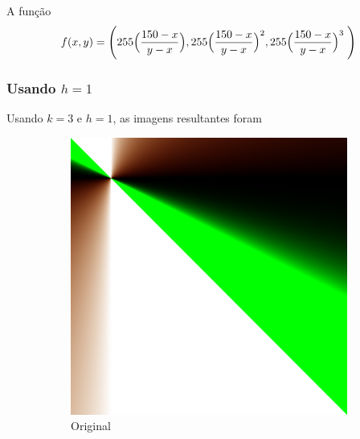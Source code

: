 \documentclass{article}
\begin{document}
A função
\begin{equation}
  f(x,y) = \Biggl( 255 \Bigl(\dfrac{150-x}{y-x}\Bigr) , 255 \Bigl(\dfrac{150-x}{y-x}\Bigr)^2 , 255 \Bigl(\dfrac{150-x}{y-x}\Bigr)^3 \; \Biggr) \label{eq:funcaoPolinomial}
\end{equation}

\subsubsection[Usando h=1]{Usando $h=1$}

Usando $k=3$ e $h=1$, as imagens resultantes foram

\begin{figure}[ht]
  \centering
  \begin{subfigure}{0.23\textwidth}
    \centering
    \includegraphics[width=\textwidth]{polinomial/polinomial.png}
    \caption{Original}
  \end{subfigure}%
  \hfill
  \begin{subfigure}{0.23\textwidth}
    \centering

\end{subfigure}
\end{figure}
\end{document}
